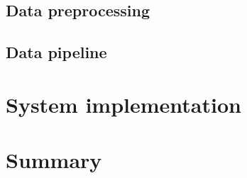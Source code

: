 \documentclass[thesis.tex]{subfiles}
\begin{document}
\subsection{Data preprocessing}

\subsection{Data pipeline}






\section{System implementation} \label{sec:system_implementation}







\section{Summary} \label{sec:C3-summary}
\end{document}
